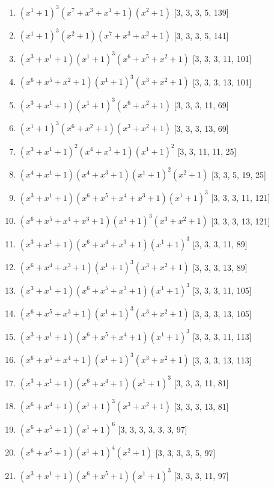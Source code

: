 \documentclass[10pt,twocolumn]{article}
\begin{document}
\begin{enumerate}
\item $(x^{1} + 1)^{3}(x^{7} + x^{3} + x^{1} + 1)(x^{2} + 1)$  [3, 3, 3, 5, 139]
\item $(x^{1} + 1)^{3}(x^{2} + 1)(x^{7} + x^{3} + x^{2} + 1)$  [3, 3, 3, 5, 141]
\item $(x^{3} + x^{1} + 1)(x^{1} + 1)^{3}(x^{6} + x^{5} + x^{2} + 1)$  [3, 3, 3, 11, 101]
\item $(x^{6} + x^{5} + x^{2} + 1)(x^{1} + 1)^{3}(x^{3} + x^{2} + 1)$  [3, 3, 3, 13, 101]
\item $(x^{3} + x^{1} + 1)(x^{1} + 1)^{3}(x^{6} + x^{2} + 1)$  [3, 3, 3, 11, 69]
\item $(x^{1} + 1)^{3}(x^{6} + x^{2} + 1)(x^{3} + x^{2} + 1)$  [3, 3, 3, 13, 69]
\item $(x^{3} + x^{1} + 1)^{2}(x^{4} + x^{3} + 1)(x^{1} + 1)^{2}$  [3, 3, 11, 11, 25]
\item $(x^{4} + x^{1} + 1)(x^{4} + x^{3} + 1)(x^{1} + 1)^{2}(x^{2} + 1)$  [3, 3, 5, 19, 25]
\item $(x^{3} + x^{1} + 1)(x^{6} + x^{5} + x^{4} + x^{3} + 1)(x^{1} + 1)^{3}$  [3, 3, 3, 11, 121]
\item $(x^{6} + x^{5} + x^{4} + x^{3} + 1)(x^{1} + 1)^{3}(x^{3} + x^{2} + 1)$  [3, 3, 3, 13, 121]
\item $(x^{3} + x^{1} + 1)(x^{6} + x^{4} + x^{3} + 1)(x^{1} + 1)^{3}$  [3, 3, 3, 11, 89]
\item $(x^{6} + x^{4} + x^{3} + 1)(x^{1} + 1)^{3}(x^{3} + x^{2} + 1)$  [3, 3, 3, 13, 89]
\item $(x^{3} + x^{1} + 1)(x^{6} + x^{5} + x^{3} + 1)(x^{1} + 1)^{3}$  [3, 3, 3, 11, 105]
\item $(x^{6} + x^{5} + x^{3} + 1)(x^{1} + 1)^{3}(x^{3} + x^{2} + 1)$  [3, 3, 3, 13, 105]
\item $(x^{3} + x^{1} + 1)(x^{6} + x^{5} + x^{4} + 1)(x^{1} + 1)^{3}$  [3, 3, 3, 11, 113]
\item $(x^{6} + x^{5} + x^{4} + 1)(x^{1} + 1)^{3}(x^{3} + x^{2} + 1)$  [3, 3, 3, 13, 113]
\item $(x^{3} + x^{1} + 1)(x^{6} + x^{4} + 1)(x^{1} + 1)^{3}$  [3, 3, 3, 11, 81]
\item $(x^{6} + x^{4} + 1)(x^{1} + 1)^{3}(x^{3} + x^{2} + 1)$  [3, 3, 3, 13, 81]
\item $(x^{6} + x^{5} + 1)(x^{1} + 1)^{6}$  [3, 3, 3, 3, 3, 3, 97]
\item $(x^{6} + x^{5} + 1)(x^{1} + 1)^{4}(x^{2} + 1)$  [3, 3, 3, 3, 5, 97]
\item $(x^{3} + x^{1} + 1)(x^{6} + x^{5} + 1)(x^{1} + 1)^{3}$  [3, 3, 3, 11, 97]

\end{enumerate}
\end{document}
